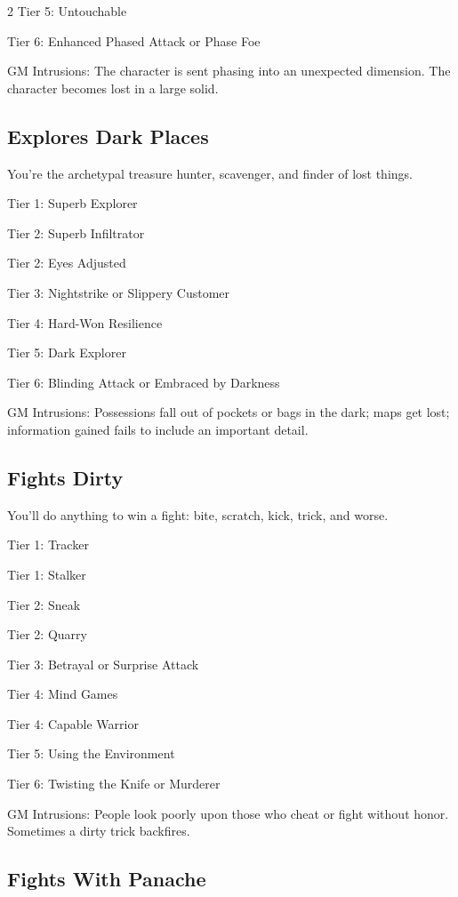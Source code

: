 \begin{multicols}{2}
Tier 5: Untouchable

Tier 6: Enhanced Phased Attack or Phase Foe

GM Intrusions: The character is sent phasing into an unexpected dimension. The character becomes lost in a large solid.

\subsection{Explores Dark Places}

You’re the archetypal treasure hunter, scavenger, and finder of lost things. 

Tier 1: Superb Explorer

Tier 2: Superb Infiltrator

Tier 2: Eyes Adjusted

Tier 3: Nightstrike or Slippery Customer

Tier 4: Hard-Won Resilience

Tier 5: Dark Explorer

Tier 6: Blinding Attack or Embraced by Darkness

GM Intrusions: Possessions fall out of pockets or bags in the dark; maps get lost; information gained fails to include an important detail.

\subsection{Fights Dirty}

You’ll do anything to win a fight: bite, scratch, kick, trick, and worse.

Tier 1: Tracker

Tier 1: Stalker

Tier 2: Sneak

Tier 2: Quarry

Tier 3: Betrayal or Surprise Attack

Tier 4: Mind Games

Tier 4: Capable Warrior

Tier 5: Using the Environment

Tier 6: Twisting the Knife or Murderer

GM Intrusions: People look poorly upon those who cheat or fight without honor. Sometimes a dirty trick backfires.

\subsection{Fights With Panache}


\end{multicols}
